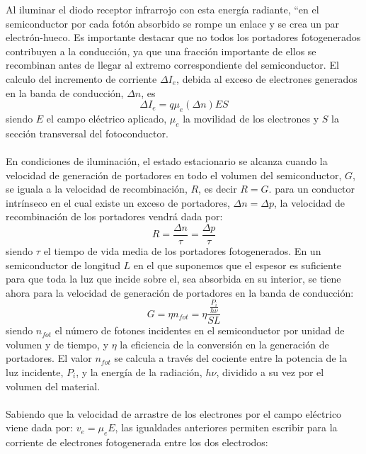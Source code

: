 \documentclass[12]{article}
\begin{document}
\begin{multicols}{2}
Al iluminar el diodo receptor infrarrojo con esta energía radiante, ``en el semiconductor por cada fotón absorbido se rompe un enlace y se crea un par electrón-hueco. 
Es importante destacar que no todos los portadores fotogenerados contribuyen a la conducción, ya que una fracción importante de ellos se recombinan antes de llegar al extremo correspondiente del semiconductor. El calculo del incremento de corriente $\Delta I_{e}$, debida al exceso de electrones generados en la banda de conducción, $\Delta n$, es
\begin {equation}
\Delta I_{e} = q\mu _{e}(\Delta n)ES
\end{equation} 
siendo $E$ el campo eléctrico aplicado, $\mu_{e}$ la movilidad de los electrones y $S$ la sección transversal del fotoconductor.\\\\
En condiciones de iluminación, el estado estacionario se alcanza cuando la velocidad de generación de portadores en todo el volumen del semiconductor, $G$, se iguala a la velocidad de recombinación, $R$, es decir $R = G$. para un conductor intrínseco en el cual existe un exceso de portadores, $\Delta n = \Delta p$, la velocidad de recombinación de los portadores vendrá dada por:
\begin{equation}
R = \frac{\Delta n }{\tau} = \frac{\Delta p}{\tau}
\end{equation}
siendo $\tau$ el tiempo de vida media de los portadores fotogenerados. En un semiconductor de longitud $L$ en el que suponemos que el espesor es suficiente para que toda la luz que incide sobre el, sea absorbida en su interior, se tiene ahora para la velocidad de generación de portadores en la banda de conducción:
\begin{equation}
G = \eta n_{fot} = \eta \frac{\frac{P_{i}}{h\nu}}{SL}
\end{equation}
siendo $n_{fot}$ el número de fotones incidentes en el semiconductor por unidad de volumen y de tiempo, y $\eta$ la eficiencia de la conversión en la generación de portadores. El valor $n_{fot}$ se calcula a través del cociente entre la potencia de la luz incidente, $P_{i}$, y la energía de la radiación, $h\nu$, dividido a su vez por el volumen del material.\\ \\
Sabiendo que la velocidad de arrastre de los electrones por el campo eléctrico viene dada por: $v_{e} = \mu_{e}E$, las igualdades anteriores permiten escribir para la corriente de electrones fotogenerada entre los dos electrodos:
\begin{equation}

\end{equation}
\end{multicols}
\end{document}
